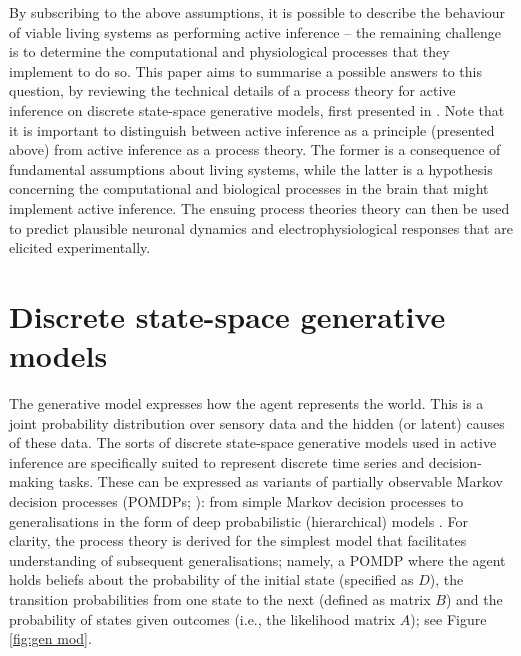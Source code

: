 \documentclass[review,12pt,authoryear]{elsarticle}
\begin{document}
By subscribing to the above assumptions, it is possible to describe the behaviour of viable living systems as performing active inference -- the remaining challenge is to determine the computational and physiological processes that they implement to do so. This paper aims to summarise a possible answers to this question, by reviewing the technical details of a process theory for active inference on discrete state-space generative models, first presented in \citep{fristonActiveInferenceProcess2017}. Note that it is important to distinguish between active inference as a principle (presented above) from active inference as a process theory. The former is a consequence of fundamental assumptions about living systems, while the latter is a hypothesis concerning the computational and biological processes in the brain that might implement active inference. The ensuing process theories theory can then be used to predict plausible neuronal dynamics and electrophysiological responses that are elicited experimentally.

\section{Discrete state-space generative models}

The generative model \citep{bishopPatternRecognitionMachine2006} expresses how the agent represents the world. This is a joint probability distribution over sensory data and the hidden (or latent) causes of these data. The sorts of discrete state-space generative models used in active inference are specifically suited to represent discrete time series and decision-making tasks. These can be expressed as variants of partially observable Markov decision processes (POMDPs; \citep{astromOptimalControlMarkov1965}): from simple Markov decision processes \citep{bartoReinforcementLearningIntroduction1992,stoneArtificialIntelligenceEngines2019,whiteMarkovDecisionProcesses2001} to generalisations in the form of deep probabilistic (hierarchical) models \citep{fristonDeepTemporalModels2018,boxMultiparameterProblemsBayesian1965,allenbyHierarchicalBayesModels2005}. For clarity, the process theory is derived for the simplest model that facilitates understanding of subsequent generalisations; namely, a POMDP where the agent holds beliefs about the probability of the initial state (specified as $D$), the transition probabilities from one state to the next (defined as matrix $B$) and the probability of states given outcomes (i.e., the likelihood matrix $A$); see Figure \ref{fig:gen mod}.
\end{document}
